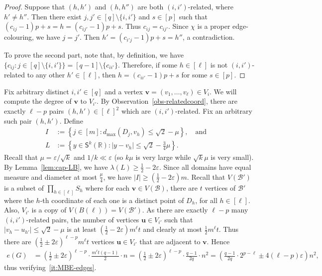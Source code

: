 \documentclass[10pt,a4paper]{article}
\newcommand{\V}[1]{\mathbold{#1}}
\theoremstyle{definition}
\def\eps{{\varepsilon}}
\newcommand{\cB}{\mathcal{B}}
\newcommand{\sS}{\mathsf{S}}
\newcommand{\sR}{\mathbb{R}}
\begin{document}
\begin{proof}
	Suppose that $(h,h')$ and $(h,h'')$ are both $(i,i')$-related, where $h' \neq h''$. Then
	there exist $j,j' \in [q]\setminus\lbrace i,i'\rbrace$ and $s \in [p]$ such that $(c_{ij}-1)p+s = h = (c_{ij'}-1)p+s$.
	Thus $c_{ij}=c_{ij'}$. Since $\chi$ is a proper edge-colouring, we have $j=j'$. Then $h' = (c_{i'j}-1)p+s = h''$, a contradiction.
	
	To prove the second part, note that, by definition, we have $\lbrace c_{ij} : j \in [q]\setminus\lbrace i,i'\rbrace \rbrace = [q-1]\setminus\lbrace c_{ii'}\rbrace$. Therefore, if some $h\in [\ell]$ is not $(i,i')$-related to any other $h'\in [\ell]$, then $h=(c_{ii'}-1)p+s$ for some $s \in [p]$.
\end{proof}


Fix arbitrary distinct $i,i'\in [q]$ and a vertex $\V{v}=(v_1,\ldots,v_\ell)\in V_i$. We will compute the degree of $\V{v}$ to $V_{i'}$. By
Observation~\ref{obs-relatedcoord}, there are exactly $\ell-p$ pairs $(h,h')\in [\ell]^2$ which are $(i,i')$-related. Fix an arbitrary such pair $(h,h')$. Define
\begin{align*}
I&:=\left\{j\in [m]:d_{\max}(D_j,v_h)\le \sqrt{2}-\mu\right\},\quad\text{and}\quad\\
L&:=\left\{y\in \sS^k(\sR):|y-v_h|\le \sqrt{2}-\frac{3}{4}\mu\right\}.
\end{align*}
Recall that $\mu = \eps/\sqrt{k}$ and $1/k \ll \eps$ (so $k\mu$ is very large while $\sqrt{k}\mu$ is very small).
By Lemma~\ref{lem:cap-LB}, we have $\lambda(L)\ge  \frac{1}{2}-2\eps$. Since all domains have equal measure and diameter at most $\frac{\mu}{4}$, we have
$|I|\ge\left(\frac{1}{2}-2\eps\right)m$.
Recall that $V(\cB')$ is a subset of $\prod_{h \in [\ell]}S_h$ where for each $\V{v} \in V(\cB)$, there are $t$ vertices of $\cB'$ where the $h$-th coordinate of each one is a distinct point of $D_h$, for all $h \in [\ell]$.
Also, $V_{i'}$ is a copy of $V(B(\ell))=V(\cB')$.
As there are exactly $\ell-p$ many $(i,i')$-related pairs, the number of vertices $\V{u}\in V_{i'}$ such that $|v_{h}-u_{h'}|\le \sqrt{2}-\mu$ is at least $\left(\frac{1}{2}-2\eps\right)m^\ell t$ and clearly at most $\frac{1}{2}m^\ell t$. Thus there are $\left(\frac{1}{2}\pm 2\eps\right)^{\ell-p}m^\ell t$ vertices $\V{u}\in V_{i'}$ that are adjacent to $\V{v}$. Hence
\begin{align*}
e(G)&= \left(\frac{1}{2}\pm 2\eps\right)^{\ell-p}\cdot\frac{m^\ell  t  (q-1)}{2}\cdot n=\left(\frac{1}{2}\pm 2\eps\right)^{\ell-p} \cdot\frac{q-1}{2q}\cdot n^2= \left(\frac{q-1}{2q}\cdot 2^{p-\ell}\pm 4(\ell-p)\eps\right)  n^2,
\end{align*}	
thus verifying~\ref{it:MBE-edges}.
\end{document}
